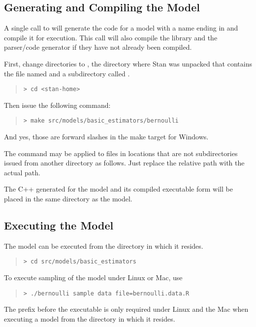 \subsection{Generating and Compiling the Model}

A single call to  will generate the \Cpp code for a
model with a name ending in  and compile it for
execution.  This call will also compile the library 
and the parser/code generator  if they have not already
been compiled.

First, change directories to , the directory where
Stan was unpacked that contains the file named  and
a subdirectory called .
%
\begin{quote}
\begin{Verbatim}[fontshape=sl,fontsize=\small]
> cd <stan-home>
\end{Verbatim}
\end{quote}
%
Then issue the following command:
%
\begin{quote}
\begin{Verbatim}[fontshape=sl,fontsize=\small]
> make src/models/basic_estimators/bernoulli 
\end{Verbatim}
\end{quote}
And yes, those are forward slashes in the make target for Windows.

The  command may be applied to files in locations
that are not subdirectories issued from another directory as follows.
Just replace the relative path  with the
actual path.

The C++ generated for the model and its compiled executable
form will be placed in the same directory as the model.


\subsection{Executing the Model}

The model can be executed from the directory in which it resides.
%
\begin{quote}
\begin{Verbatim}[fontshape=sl,fontsize=\small]
> cd src/models/basic_estimators 
\end{Verbatim}
\end{quote}
%
To execute sampling of the model under Linux or Mac, use
%
\begin{quote}
\begin{Verbatim}[fontshape=sl,fontsize=\small]
> ./bernoulli sample data file=bernoulli.data.R
\end{Verbatim}
\end{quote}
%
The  prefix before the executable is only required under
Linux and the Mac when executing a model from the directory in which
it resides.

